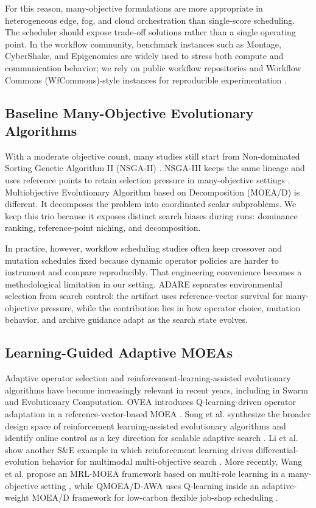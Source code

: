 \documentclass[preprint,12pt]{elsarticle}
\begin{document}
For this reason, many-objective formulations are more appropriate in heterogeneous edge, fog, and cloud orchestration than single-score scheduling. The scheduler should expose trade-off solutions rather than a single operating point. In the workflow community, benchmark instances such as Montage, CyberShake, and Epigenomics are widely used to stress both compute and communication behavior; we rely on public workflow repositories and Workflow Commons (WfCommons)-style instances for reproducible experimentation \cite{coleman2021wfcommons}.

\subsection{Baseline Many-Objective Evolutionary Algorithms}
With a moderate objective count, many studies still start from Non-dominated Sorting Genetic Algorithm II (NSGA-II) \cite{deb2002nsga2}. NSGA-III keeps the same lineage and uses reference points to retain selection pressure in many-objective settings \cite{deb2014nsga3}. Multiobjective Evolutionary Algorithm based on Decomposition (MOEA/D) \cite{zhang2007moead} is different. It decomposes the problem into coordinated scalar subproblems. We keep this trio because it exposes distinct search biases during runs: dominance ranking, reference-point niching, and decomposition.

In practice, however, workflow scheduling studies often keep crossover and mutation schedules fixed because dynamic operator policies are harder to instrument and compare reproducibly. That engineering convenience becomes a methodological limitation in our setting. ADARE separates environmental selection from search control: the artifact uses reference-vector survival for many-objective pressure, while the contribution lies in how operator choice, mutation behavior, and archive guidance adapt as the search state evolves.

\subsection{Learning-Guided Adaptive MOEAs}
Adaptive operator selection and reinforcement-learning-assisted evolutionary algorithms have become increasingly relevant in recent years, including in Swarm and Evolutionary Computation. OVEA introduces Q-learning-driven operator adaptation in a reference-vector-based MOEA \cite{jiao2023ovea}. Song et al. synthesize the broader design space of reinforcement learning-assisted evolutionary algorithms and identify online control as a key direction for scalable adaptive search \cite{song2024survey}. Li et al. show another S\&E example in which reinforcement learning drives differential-evolution behavior for multimodal multi-objective search \cite{li2019derlfr}. More recently, Wang et al. propose an MRL-MOEA framework based on multi-role learning in a many-objective setting \cite{wang2025mrlmoea}, while QMOEA/D-AWA uses Q-learning inside an adaptive-weight MOEA/D framework for low-carbon flexible job-shop scheduling \cite{wang2026qmoeadawa}.
\end{document}
